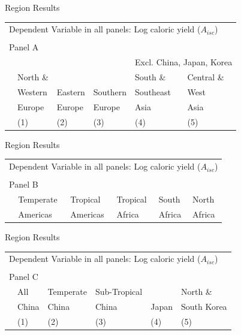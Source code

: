 \documentclass[10pt, xcolor=dvipsnames]{beamer}
\begin{document}
\begin{frame}{Region Results}\label{subregiontab}

{\footnotesize
\begin{tabularx}{\textwidth}{lXXXXX}
\midrule
\multicolumn{6}{l}{Dependent Variable in all panels: Log caloric yield ($A_{isc}$)} \\ \\
\multicolumn{6}{l}{Panel A} \\
 &          &         &             &  \multicolumn{2}{c}{Excl. China, Japan, Korea} \\ \cmidrule(lr){5-6}
 & North \& &         &              & South \&  & Central \&             \\
 & Western  & Eastern & Southern     & Southeast & West        \\
 & Europe   & Europe  & Europe       & Asia      & Asia      \\
 & (1) & (2) & (3) & (4) & (5) \\
\midrule

\midrule
\end{tabularx}
}

\hfill \hyperlink{subregion}{}
\end{frame}

\begin{frame}{Region Results}

{\footnotesize
\begin{tabularx}{\textwidth}{lXXXXX}
\midrule
\multicolumn{6}{l}{Dependent Variable in all panels: Log caloric yield ($A_{isc}$)} \\ \\
\multicolumn{6}{l}{Panel B} \\
 & Temperate & Tropical  & Tropical & South    & North    \\
 & Americas  & Americas  & Africa   & Africa   & Africa     \\
\midrule

\midrule
\end{tabularx}
}

\end{frame}

\begin{frame}{Region Results}

{\footnotesize
\begin{tabularx}{\textwidth}{lXXXXX}
\midrule
\multicolumn{6}{l}{Dependent Variable in all panels: Log caloric yield ($A_{isc}$)} \\ \\
\multicolumn{6}{l}{Panel C} \\
 & All& Temperate & Sub-Tropical & & North \& \\
 & China & China  & China & Japan & South Korea  \\
 & (1) & (2) & (3) & (4) & (5) \\
\midrule

\midrule
\end{tabularx}
}

\end{frame}
\end{document}
